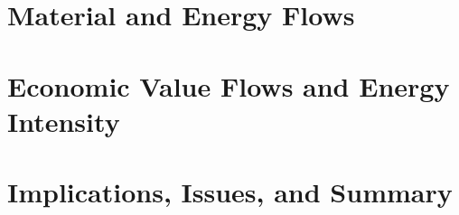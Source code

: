 \documentclass[graybox,envcountchap,sectrefs]{svmono}
\begin{document}



\part{Material and Energy Flows}
\label{part:matter}







\part{Economic Value Flows and Energy Intensity}
\label{part:values}

 

 

\part{Implications, Issues, and Summary}
\label{part:implications}










\begin{appendices}
	
	

	

	

	

	

\end{appendices}
\end{document}
